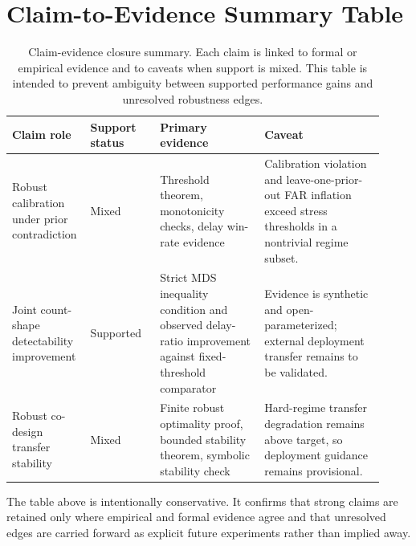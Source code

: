 \section{Claim-to-Evidence Summary Table}\label{sec:appendix_claims}
\begin{table}[h]
\caption{Claim-evidence closure summary. Each claim is linked to formal or empirical evidence and to caveats when support is mixed. This table is intended to prevent ambiguity between supported performance gains and unresolved robustness edges.}
\label{tab:claim_evidence_appendix}
\centering
\footnotesize
\renewcommand{\arraystretch}{1.1}
\setlength{\tabcolsep}{4pt}
\begin{tabular}{p{0.16\linewidth}p{0.18\linewidth}p{0.27\linewidth}p{0.31\linewidth}}
\hline
Claim role & Support status & Primary evidence & Caveat \\
\hline
Robust calibration under prior contradiction & Mixed & Threshold theorem, monotonicity checks, delay win-rate evidence & Calibration violation and leave-one-prior-out FAR inflation exceed stress thresholds in a nontrivial regime subset. \\
Joint count-shape detectability improvement & Supported & Strict MDS inequality condition and observed delay-ratio improvement against fixed-threshold comparator & Evidence is synthetic and open-parameterized; external deployment transfer remains to be validated. \\
Robust co-design transfer stability & Mixed & Finite robust optimality proof, bounded stability theorem, symbolic stability check & Hard-regime transfer degradation remains above target, so deployment guidance remains provisional. \\
\hline
\end{tabular}
\end{table}

The table above is intentionally conservative. It confirms that strong claims are retained only where empirical and formal evidence agree and that unresolved edges are carried forward as explicit future experiments rather than implied away.
